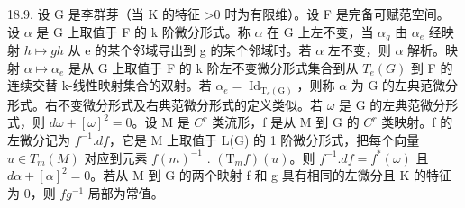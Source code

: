 18.9. 设 G 是李群芽（当 K 的特征 \textgreater0 时为有限维）。设 F 是完备可赋范空间。设 \(\alpha\) 是 G 上取值于 F 的 k 阶微分形式。称 \(\alpha\) 在 G 上左不变，当 \(\alpha_{g}\) 由 \(\alpha_{e}\) 经映射 \(h \mapsto gh\) 从 e 的某个邻域导出到 g 的某个邻域时。若 \(\alpha\) 左不变，则 \(\alpha\) 解析。映射 \(\alpha \mapsto \alpha_{e}\) 是从 G 上取值于 F 的 k 阶左不变微分形式集合到从 \(T_{e}(G)\) 到 F 的连续交替 k-线性映射集合的双射。若 \(\alpha_{e} = \operatorname{Id}_{\mathrm{T}_e(\mathrm{G})}\)，则称 \(\alpha\) 为 G 的左典范微分形式。右不变微分形式及右典范微分形式的定义类似。若 \(\omega\) 是 G 的左典范微分形式，则 \(d\omega + [\omega]^{2} = 0\)。设 M 是 \(C^{r}\) 类流形，f 是从 M 到 G 的 \(C^{r}\) 类映射。f 的左微分记为 \(f^{-1}.df\)，它是 M 上取值于 L(G) 的 1 阶微分形式，把每个向量 \(u \in T_{m}(M)\) 对应到元素 \(f(m)^{-1}\) . \((\mathrm{T}_{m}f)(u)\)。则 \(f^{-1}.df = f^{*}(\omega)\) 且 \(d\alpha + [\alpha]^{2} = 0\)。若从 M 到 G 的两个映射 f 和 g 具有相同的左微分且 K 的特征为 0，则 \(fg^{-1}\) 局部为常值。

